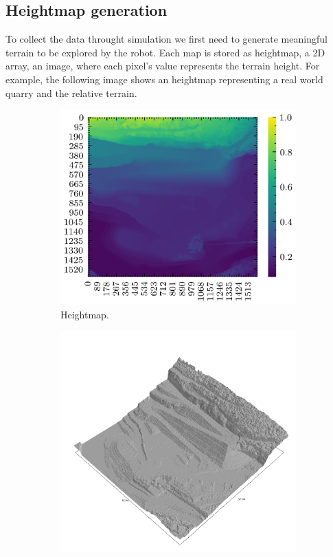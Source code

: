 \documentclass[../document.tex]{subfiles}
\begin{document}
\subsection{Heightmap generation}
\label{subsec: heightmap-generation}
To collect the data throught simulation we first need to generate meaningful terrain to be explored by the robot. Each map is stored as heightmap, a 2D array, an image, where each pixel's value represents the terrain height. For example, the following image shows an heightmap representing a real world quarry and the relative terrain.
\begin{figure}[H]
    \centering
        \begin{subfigure}[b]{0.45\textwidth}
            \includegraphics[width=\textwidth]{../img/hm/querry-big-10.png}
            \caption{Heightmap.}
        \end{subfigure}
        \begin{subfigure}[b]{0.45\linewidth}
            \includegraphics[width=\textwidth]{../img/hm3d_borders/querry-big-10.png}

\end{subfigure}
\end{figure}
\end{document}
